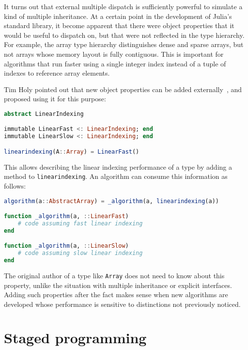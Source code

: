 It turns out that external multiple dispatch is sufficiently powerful
to simulate a kind of multiple inheritance.
At a certain point in the development of Julia's standard library,
it become apparent that there were object properties that it would be
useful to dispatch on, but that were not reflected in the type hierarchy.
For example, the array type hierarchy distinguishes dense and sparse
arrays, but not arrays whose memory layout is fully contiguous.
This is important for algorithms that run faster using a single
integer index instead of a tuple of indexes to reference array elements.

Tim Holy pointed out that new object properties can be added
externally~\cite{timholytrait}, and proposed using it for this purpose:

\begin{singlespace}
\begin{lstlisting}[language=julia]
abstract LinearIndexing

immutable LinearFast <: LinearIndexing; end
immutable LinearSlow <: LinearIndexing; end

linearindexing(A::Array) = LinearFast()
\end{lstlisting}
\end{singlespace}

\noindent
This allows describing the linear indexing performance of a type by adding
a method to \texttt{linearindexing}.
An algorithm can consume this information as follows:

\begin{singlespace}
\begin{lstlisting}[language=julia]
algorithm(a::AbstractArray) = _algorithm(a, linearindexing(a))

function _algorithm(a, ::LinearFast)
    # code assuming fast linear indexing
end

function _algorithm(a, ::LinearSlow)
    # code assuming slow linear indexing
end
\end{lstlisting}
\end{singlespace}

\noindent
The original author of a type like \texttt{Array} does not need to know
about this property, unlike the situation with multiple inheritance or
explicit interfaces.
Adding such properties after the fact makes sense when new algorithms
are developed whose performance is sensitive to distinctions not
previously noticed.


\section{Staged programming}
\label{sec:stagedprogramming}

